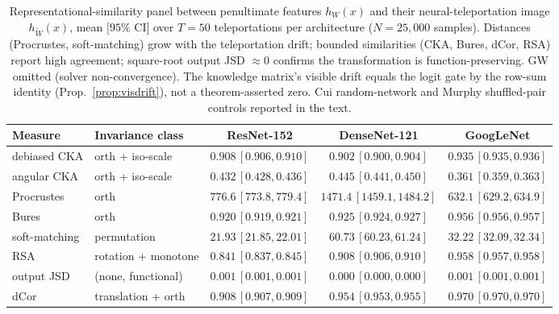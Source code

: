 \begin{table}[htbp]
\centering
\caption{Representational-similarity panel between penultimate features $h_W(x)$ and their
neural-teleportation image $h_{\tilde W}(x)$, mean $[95\%$ CI$]$ over $T=50$ teleportations
per architecture ($N=25{,}000$ samples). Distances (Procrustes, soft-matching) grow with the
teleportation drift; bounded similarities (CKA, Bures, dCor, RSA) report high agreement;
square-root output JSD $\approx 0$ confirms the transformation is function-preserving. GW
omitted (solver non-convergence). The knowledge matrix's visible drift equals the logit gate
by the row-sum identity (Prop.~\ref{prop:visdrift}), not a theorem-asserted zero.
Cui random-network and Murphy shuffled-pair controls reported in the text.}
\label{tab:s1_table}
\begin{tabular}{llccc}
\toprule
Measure & Invariance class & ResNet-152 & DenseNet-121 & GoogLeNet \\
\midrule
debiased CKA  & orth + iso-scale     & $0.908\,[0.906,0.910]$ & $0.902\,[0.900,0.904]$ & $0.935\,[0.935,0.936]$ \\
angular CKA   & orth + iso-scale     & $0.432\,[0.428,0.436]$ & $0.445\,[0.441,0.450]$ & $0.361\,[0.359,0.363]$ \\
Procrustes    & orth                 & $776.6\,[773.8,779.4]$ & $1471.4\,[1459.1,1484.2]$ & $632.1\,[629.2,634.9]$ \\
Bures         & orth                 & $0.920\,[0.919,0.921]$ & $0.925\,[0.924,0.927]$ & $0.956\,[0.956,0.957]$ \\
soft-matching & permutation          & $21.93\,[21.85,22.01]$ & $60.73\,[60.23,61.24]$ & $32.22\,[32.09,32.34]$ \\
RSA           & rotation + monotone  & $0.841\,[0.837,0.845]$ & $0.908\,[0.906,0.910]$ & $0.958\,[0.957,0.958]$ \\
output JSD    & (none, functional)   & $0.001\,[0.001,0.001]$ & $0.000\,[0.000,0.000]$ & $0.001\,[0.001,0.001]$ \\
dCor          & translation + orth   & $0.908\,[0.907,0.909]$ & $0.954\,[0.953,0.955]$ & $0.970\,[0.970,0.970]$ \\
\bottomrule
\end{tabular}
\end{table}
